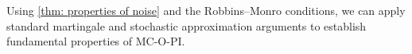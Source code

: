 Using \autoref{thm: properties of noise} and the Robbins--Monro conditions,
we can apply standard martingale and stochastic approximation arguments to establish fundamental properties of MC-O-PI.





























































